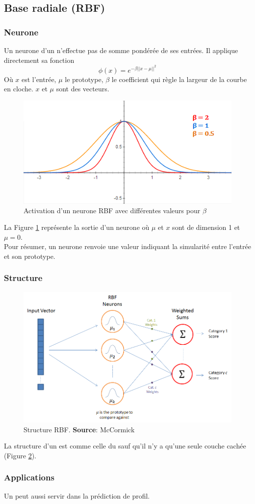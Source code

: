 \subsection{Base radiale (RBF)}
\subsubsection*{Neurone}
Un neurone d'un \rbf n'effectue pas de somme pondérée de ses entrées. Il applique directement sa fonction \[\phi(x) = e^{-\beta||x-\mu||^2}\]
Où $x$ est l'entrée, $\mu$ le prototype, $\beta$ le coefficient qui règle la largeur de la courbe en cloche. $x$ et $\mu$ sont des vecteurs.
\begin{figure}
 \centering
 \includegraphics[scale=0.7]{../figures/RBFactivation.png}
 \caption{Activation d'un neurone RBF avec différentes valeurs pour $\beta$}
 \label{rbfactivation}
\end{figure}
La Figure \ref{rbfactivation} représente la sortie d'un neurone \rbf où $\mu$ et $x$ sont de dimension 1 et $\mu = 0$.\\
Pour résumer, un neurone \rbf renvoie une valeur indiquant la simularité entre l'entrée et son prototype.
\subsubsection*{Structure}
\begin{figure}
 \centering
 \includegraphics[scale=0.5]{../figures/RBFstruct.png}
 \caption{Structure RBF. \textbf{Source}: McCormick\cite{RBFtuto}}
 \label{structurerbf}
\end{figure}
La structure d'un \rbf est comme celle du \mlp sauf qu'il n'y a qu'une seule couche cachée (Figure \ref{structurerbf}).
\subsubsection*{Applications}
Un \rbf peut aussi servir dans la prédiction de profil.\cite{statistica}